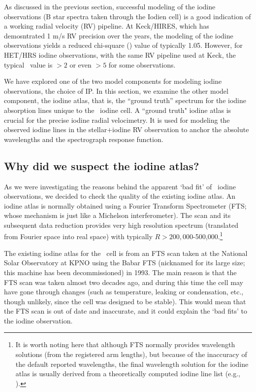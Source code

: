 
As discussed in the previous section, successful modeling of the
iodine observations (B star spectra taken through the Iodien cell) is
a good indication of a working radial velocity (RV) pipeline. At
Keck/HIRES, which has demosntrated 1 m/s RV precision over the years,
the modeling of the iodine observations yields a reduced chi-square
(\chisq) value of typically 1.05. However, for HET/HRS iodine
observations, with the same RV pipeline used at Keck, the typical
\chisq\ value is $>2$ or even $>5$ for some observations. 

We have explored one of the two model components for modeling iodine
observations, the choice of IP. In this section, we examine the other
model component, the iodine atlas, that is, the ``ground truth''
spectrum for the iodine absorption lines unique to the \het\ iodine
cell. A ``ground truth" iodine atlas is crucial for the precise iodine
radial velocimetry. It is used for modeling the observed iodine lines
in the stellar$+$iodine RV observation to anchor the absolute
wavelengths and the spectrograph response function. 


\subsection{Why did we suspect the iodine atlas?}

As we were investigating the reasons behind the apparent `bad fit' of
\het\ iodine observations, we decided to check the quality of the
existing iodine atlas. An iodine atlas is normally obtained using a
Fourier Transform Spectrometer (FTS; whose mechanism is just like a
Michelson interferometer). The scan and its subsequent data reduction
provides very high resolution spectrum (translated from Fourier space
into real space) with typically $R > 200,000$-500,000.\footnote{It is worth
noting here that although FTS normally provides wavelength solutions
(from the registered arm lengths), but because of the inaccuracy of
the default reported wavelengths, the final wavelength solution for
the iodine atlas is usually derived from a theoretically computed iodine
line list (e.g., \citealt{iodinespec5}).}

The existing iodine atlas for the \het\ cell is from an FTS scan taken
at the National Solar Observatory at KPNO using the Babar FTS
(nicknamed for its large size; this machine has been decommissioned)
in 1993. The main reason is that the FTS scan was taken almost two
decades ago, and during this time the cell may have gone through
changes (such as temperature, leaking or condensation, etc., though
unlikely, since the cell was designed to be stable). This would mean
that the FTS scan is out of date and inaccurate, and it could explain
the `bad fits' to the iodine observation.


